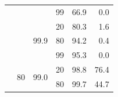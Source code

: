 \documentclass{article}
\begin{document}
\begin{table}
\begin{tabular}{|c|c|c|c|r|r|}
                                    &                                                                                        &                                                                                          & 99                                                                                      & 66.9                                                                      & 0.0                                                                       \\ \cline{3-6} 
                                    &                                                                                        & \multirow{3}{*}{99.9}                                                                    & 20                                                                                      & 80.3                                                                      & 1.6                                                                       \\ \cline{4-6} 
                                    &                                                                                        &                                                                                          & 80                                                                                      & 94.2                                                                      & 0.4                                                                       \\ \cline{4-6} 
                                    &                                                                                        &                                                                                          & 99                                                                                      & 95.3                                                                      & 0.0                                                                       \\ \cline{2-6} 
                                    & \multirow{6}{*}{80}                                                                    & \multirow{3}{*}{99.0}                                                                    & 20                                                                                      & 98.8                                                                      & 76.4                                                                      \\ \cline{4-6} 
                                    &                                                                                        &                                                                                          & 80                                                                                      & 99.7                                                                      & 44.7                                                                      \\ \cline{4-6} 

\end{tabular}
\end{table}
\end{document}
